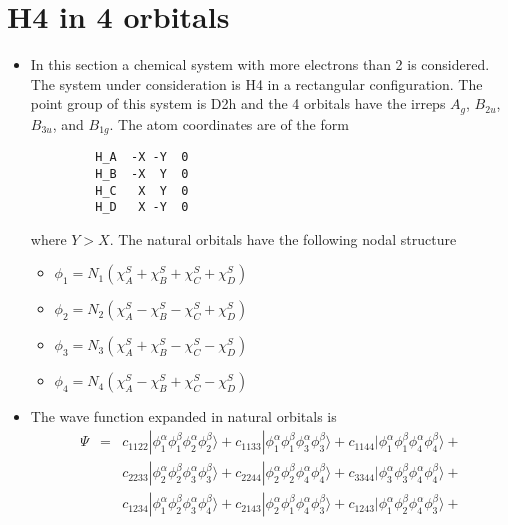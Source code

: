 \documentclass{amsart}
\begin{document}
\section{H4 in 4 orbitals}

\begin{itemize}
\item In this section a chemical system with more electrons than 2 is considered. 
         The system under consideration is H4 in a rectangular configuration. 
         The point group of this system is D2h and the 4 orbitals have the irreps $A_g$,
         $B_{2u}$, $B_{3u}$, and $B_{1g}$.
         The atom coordinates are of the form
         \begin{verbatim}
         H_A  -X -Y  0
         H_B  -X  Y  0
         H_C   X  Y  0
         H_D   X -Y  0
         \end{verbatim}
         where $Y > X$.
         The natural orbitals have the following nodal structure
         \begin{itemize}
         \item $\phi_1 = N_1\left(\chi_A^S + \chi_B^S + \chi_C^S + \chi_D^S\right)$
         \item $\phi_2 = N_2\left(\chi_A^S - \chi_B^S - \chi_C^S + \chi_D^S\right)$
         \item $\phi_3 = N_3\left(\chi_A^S + \chi_B^S - \chi_C^S - \chi_D^S\right)$
         \item $\phi_4 = N_4\left(\chi_A^S - \chi_B^S + \chi_C^S - \chi_D^S\right)$
         \end{itemize}
\item The wave function expanded in natural orbitals is
         \begin{eqnarray}
         \Psi &=& c_{1122}|\phi_1^\alpha\phi_1^\beta\phi_2^\alpha\phi_2^\beta\rangle +
                        c_{1133}|\phi_1^\alpha\phi_1^\beta\phi_3^\alpha\phi_3^\beta\rangle +
                        c_{1144}|\phi_1^\alpha\phi_1^\beta\phi_4^\alpha\phi_4^\beta\rangle + \nonumber\\
                 &&  c_{2233}|\phi_2^\alpha\phi_2^\beta\phi_3^\alpha\phi_3^\beta\rangle +
                        c_{2244}|\phi_2^\alpha\phi_2^\beta\phi_4^\alpha\phi_4^\beta\rangle +
                        c_{3344}|\phi_3^\alpha\phi_3^\beta\phi_4^\alpha\phi_4^\beta\rangle + \nonumber\\
                 &&  c_{1234}|\phi_1^\alpha\phi_2^\beta\phi_3^\alpha\phi_4^\beta\rangle +
                        c_{2143}|\phi_2^\alpha\phi_1^\beta\phi_4^\alpha\phi_3^\beta\rangle + 
                        c_{1243}|\phi_1^\alpha\phi_2^\beta\phi_4^\alpha\phi_3^\beta\rangle + \nonumber\\

\end{eqnarray}
\end{itemize}
\end{document}
